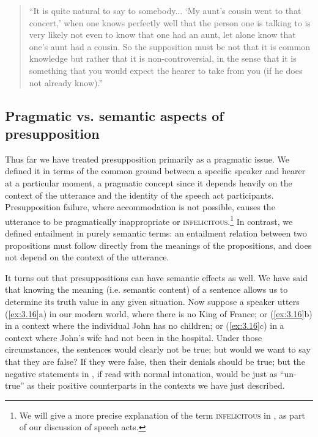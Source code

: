 \begin{quote}
“It is quite natural to say to somebody... ‘My aunt’s cousin went to that concert,’ when one knows perfectly well that the person one is talking to is very likely not even to know that one had an aunt, let alone know that one’s aunt had a cousin. So the supposition must be not that it is common knowledge but rather that it is non-controversial, in the sense that it is something that you would expect the hearer to take from you (if he does not already know).” \citep[190]{Grice1981}
\end{quote}

\subsection{Pragmatic vs. semantic aspects of presupposition}\label{sec:} %

Thus far we have treated presupposition primarily as a pragmatic issue. We defined it in terms of the common ground between a specific speaker and hearer at a particular moment, a pragmatic concept since it depends heavily on the context of the utterance and the identity of the speech act participants. Presupposition failure, where accommodation is not possible, causes the utterance to be pragmatically inappropriate or \textsc{infelicitous}.\footnote{We will give a more precise explanation of the term \textsc{infelicitous} in , as part of our discussion of speech acts.} In contrast, we defined entailment in purely semantic terms: an entailment relation between two propositions must follow directly from the meanings of the propositions, and does not depend on the context of the utterance.



It turns out that presuppositions can have semantic effects as well. We have said that knowing the meaning (i.e. semantic content) of a sentence allows us to determine its truth value in any given situation. Now suppose a speaker utters (\ref{ex:3.16}a) in our modern world, where there is no King of France; or (\ref{ex:3.16}b) in a context where the individual John has no children; or (\ref{ex:3.16}c) in a context where John’s wife had not been in the hospital. Under those circumstances, the sentences would clearly not be true; but would we want to say that they are false? If they were false, then their denials should be true; but the negative statements in , if read with normal intonation, would be just as “un-true” as their positive counterparts in the contexts we have just described.


